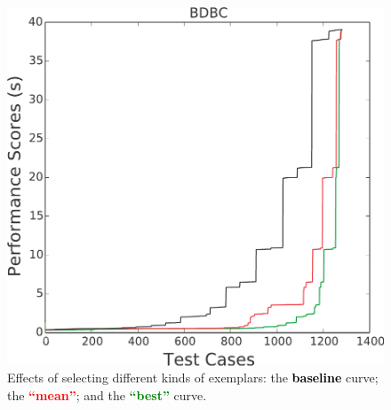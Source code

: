 \documentclass[conference]{IEEEtran}
\begin{document}
 \begin{figure}[!t]
\centering
%
\includegraphics[width=2.5inches]{figs/BDBC.pdf}
\caption{Effects of selecting different kinds of exemplars:
the   \textcolor{black}{\bf  baseline} curve; the
\textcolor{red}{\bf    ``mean''}; and the  
\textcolor{green}{\bf    ``best''} curve.}\label{fig:pp}
\end{figure}
\end{document}
